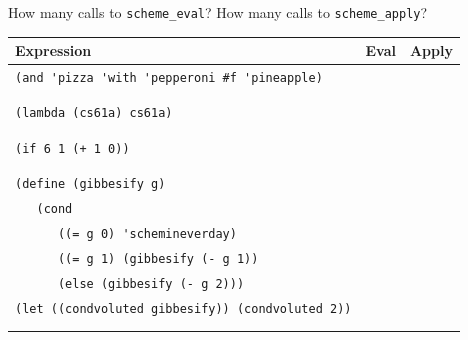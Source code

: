 \documentclass{exam}
\begin{document}
\begin{questions}
\item How many calls to \texttt{scheme\_eval}? How many calls to \texttt{scheme\_apply}?
\begin{center}
    \begin{tabular}{|m{12cm}|m{1.5cm}|m{1.5cm}|}
\hline
\textbf{Expression} & \textbf{Eval} & \textbf{Apply} \\
\hline
\lstinline$(and 'pizza 'with 'pepperoni #f 'pineapple)$ &  & \\ & & \\ & &  \\
\hline
\lstinline$(lambda (cs61a) cs61a)$ & & \\ & & \\ & & \\
\hline
\lstinline$(if 6 1 (+ 1 0))$ & &\\ & & \\ & & \\
\hline
\lstinline$(define (gibbesify g) $ & & \\
\lstinline$   (cond  $ & & \\
\lstinline$      ((= g 0) 'schemineverday)$ & & \\
\lstinline$      ((= g 1) (gibbesify (- g 1))$ & & \\
\lstinline$      (else (gibbesify (- g 2)))$ & & \\
\hline
\lstinline$(let ((condvoluted gibbesify)) (condvoluted 2))$ & &\\ & & \\ & & \\
\hline
\end{tabular}
\end{center}


\end{questions}
\end{document}
